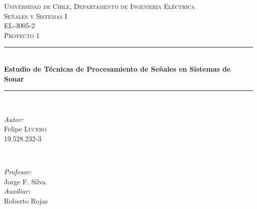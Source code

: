 \documentclass[letterpaper,11pt]{article}
\begin{document}
\begin{titlepage}

\newcommand{\HRule}{\rule{\linewidth}{0.5mm}} %

\center %
 

\textsc{\Large Universidad de Chile, Departamento de Ingeniería Eléctrica}\\[1.5cm] %
\textsc{\Large Señales y Sistemas I}\\[0.5cm] %
\textsc{\large EL-3005-2}\\[0.8cm]
\textsc{\Large Proyecto 1}\\[0.5cm] %


\HRule \\[0.4cm]
{ \huge \bfseries Estudio de Técnicas de Procesamiento de Señales en Sistemas de Sonar}\\[0.1cm] %
\HRule \\[1.5cm]
 

\begin{minipage}{0.4\textwidth}
\begin{flushleft} \large
\emph{Autor:}\\
Felipe \textsc{Lucero}\\
19.528.232-3 %
\end{flushleft}
\end{minipage}
~
\begin{minipage}{0.4\textwidth}
\begin{flushright} \large
\emph{Profesor:} \\
Jorge F. Silva
\\
[1.0cm]
\emph{Auxiliar:}\\
Roberto Rojas\\
\end{flushright}
\end{minipage}\\[2cm]


\end{titlepage}
\end{document}
